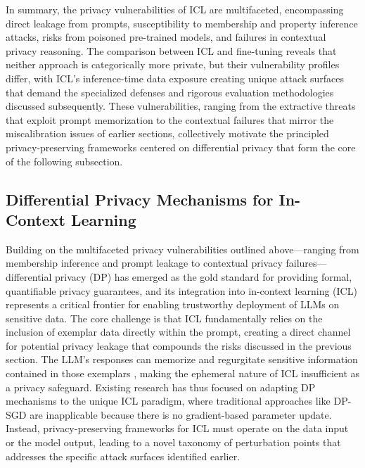 \documentclass[11pt]{article}
\begin{document}
In summary, the privacy vulnerabilities of ICL are multifaceted, encompassing direct leakage from prompts, susceptibility to membership and property inference attacks, risks from poisoned pre-trained models, and failures in contextual privacy reasoning. The comparison between ICL and fine-tuning reveals that neither approach is categorically more private, but their vulnerability profiles differ, with ICL's inference-time data exposure creating unique attack surfaces that demand the specialized defenses and rigorous evaluation methodologies discussed subsequently. These vulnerabilities, ranging from the extractive threats that exploit prompt memorization to the contextual failures that mirror the miscalibration issues of earlier sections, collectively motivate the principled privacy-preserving frameworks centered on differential privacy that form the core of the following subsection.

\subsection{Differential Privacy Mechanisms for In-Context Learning}

Building on the multifaceted privacy vulnerabilities outlined above---ranging from membership inference and prompt leakage to contextual privacy failures---differential privacy (DP) has emerged as the gold standard for providing formal, quantifiable privacy guarantees, and its integration into in-context learning (ICL) represents a critical frontier for enabling trustworthy deployment of LLMs on sensitive data. The core challenge is that ICL fundamentally relies on the inclusion of exemplar data directly within the prompt, creating a direct channel for potential privacy leakage that compounds the risks discussed in the previous section. The LLM's responses can memorize and regurgitate sensitive information contained in those exemplars \cite{ref454}, making the ephemeral nature of ICL insufficient as a privacy safeguard. Existing research has thus focused on adapting DP mechanisms to the unique ICL paradigm, where traditional approaches like DP-SGD are inapplicable because there is no gradient-based parameter update. Instead, privacy-preserving frameworks for ICL must operate on the data input or the model output, leading to a novel taxonomy of perturbation points that addresses the specific attack surfaces identified earlier.
\end{document}
